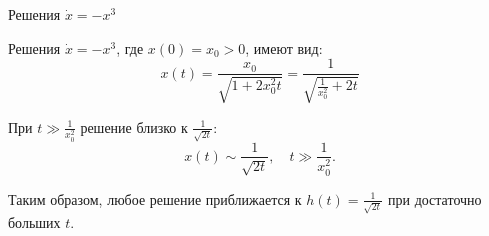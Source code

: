 \documentclass{beamer}
\begin{document}
	
	\begin{frame}{Решения \(\dot{x}=-x^3\)}
		\begin{flushleft}
			
			Решения \(\dot{x}=-x^3\), где \(x(0) = x_0 > 0\), имеют вид:
			\[
			x(t)
			=
			\frac{x_0}
			{\sqrt{1+2 x_0^2t}} 
			= 
			\frac{1}
			{\sqrt{\frac{1}{x_0^2}+2t}} 
			\]
			
			При \(t \gg \frac{1}{x_0^2}\) решение близко к \(\frac{1}{\sqrt{2t}}\):
			\[
			x(t)
			\sim
			\frac{1}{\sqrt{2t}}, \quad t \gg \frac{1}{x_0^2}.
			\]
			
			Таким образом, любое решение приближается к \(h(t) = \frac{1}{\sqrt{2t}}\) при достаточно больших \(t\).
			
		\end{flushleft}
	\end{frame}
\end{document}
